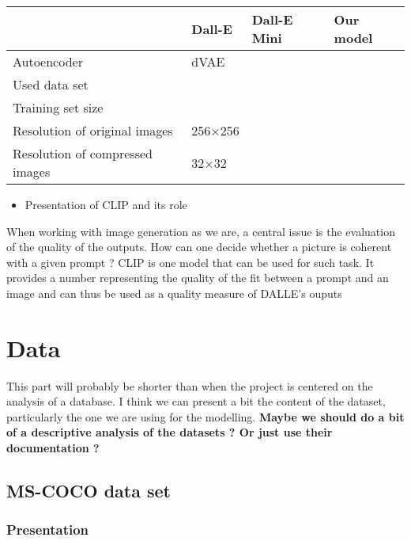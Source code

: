 \documentclass{article}
\begin{document}
\begin{table}[h!]
    \centering
    \begin{tabular}{|l|l|l|l|}
    \hline
        ~ & Dall-E & Dall-E Mini & Our model \\ \hline
        Autoencoder & dVAE & ~ & ~ \\ \hline
        Used data set & ~ & ~ & ~ \\ \hline
        Training set size & ~ & ~ & ~ \\ \hline
        Resolution of original images & 256×256 & ~  & ~ \\ \hline
        Resolution of compressed images & 32×32 & ~ & ~ \\ \hline
    \end{tabular}
\end{table}

\begin{itemize}
    \item Presentation of CLIP and its role
\end{itemize}

When working with image generation as we are, a central issue is the evaluation of the quality of the outputs. How can one decide whether a picture is coherent with a given prompt ? CLIP is one model that can be used for such task. It provides a number representing the quality of the fit between a prompt and an image and can thus be used as a quality measure of DALLE's ouputs \citet{learntransf, openaiclip}



\pagebreak
\section{Data}

This part will probably be shorter than when the project is centered on the analysis of a database. I think we can present a bit the content of the dataset, particularly the one we are using for the modelling.
\textbf{Maybe we should do a bit of a descriptive analysis of the datasets ? Or just use their documentation ?}

\subsection{MS-COCO data set}

\subsubsection{Presentation}
\end{document}
